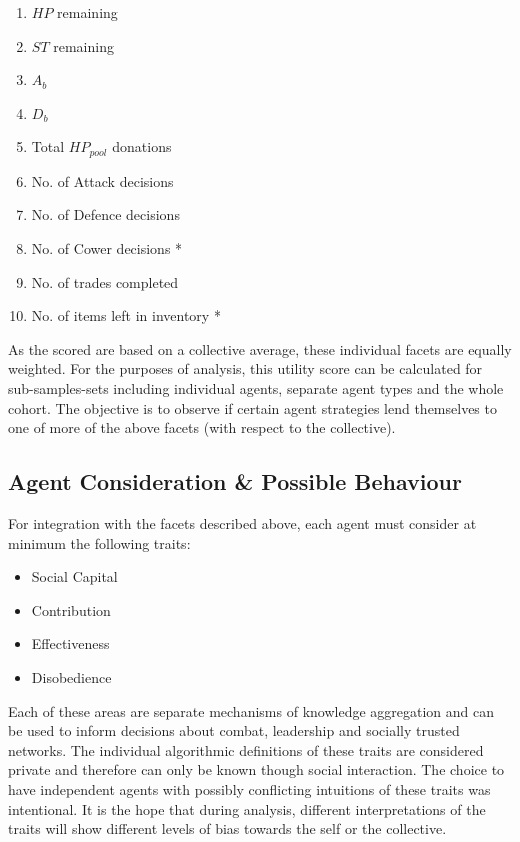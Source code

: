 \begin{enumerate}
    \item $HP$ remaining
    \item $ST$ remaining
    \item $A_b$
    \item $D_b$
    \item Total $HP_{pool}$ donations 
    \item No. of Attack decisions
    \item No. of Defence decisions
    \item No. of Cower decisions * 
    \item No. of trades completed
    \item No. of items left in inventory *
\end{enumerate}

As the scored are based on a collective average, these individual facets are equally weighted. For the purposes of analysis, this utility score can be calculated for sub-samples-sets including individual agents, separate agent types and the whole cohort. The objective is to observe if certain agent strategies lend themselves to one of more of the above facets (with respect to the collective). 


\subsection{Agent Consideration \& Possible Behaviour}\label{sec: behaviour}


For integration with the facets described above, each agent must consider at minimum the following traits:

\begin{itemize}
    \item Social Capital
    \item Contribution
    \item Effectiveness
    \item Disobedience 
\end{itemize}

Each of these areas are separate mechanisms of knowledge aggregation and can be used to inform decisions about combat, leadership and socially trusted networks. The individual algorithmic definitions of these traits are considered private and therefore can only be known though social interaction. The choice to have independent agents with possibly conflicting intuitions of these traits was intentional. It is the hope that during analysis, different interpretations of the traits will show different levels of bias towards the self or the collective. 


